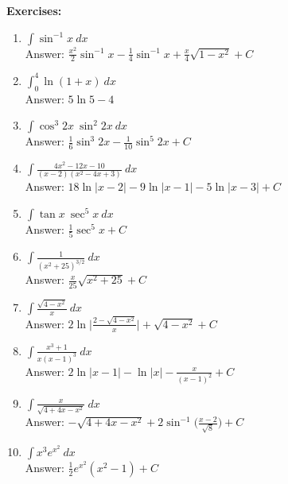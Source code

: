 \documentclass[11pt]{report}
\newcommand{\ds}{\displaystyle}
\begin{document}
\textbf{Exercises:}\\

\begin{enumerate}
\item $\ds \int \sin^{-1}x~dx$\\
Answer: $\ds\frac{x^2}{2} \sin^{-1}x - \frac{1}{4} \sin^{-1}x + \frac{x}{4} \sqrt{1-x^2}+C$\\

\item $\ds \int_0^4 \ln (1+x)~dx$\\
Answer: $\ds 5\ln 5 - 4$\\

\item $\ds \int \cos^3 2x~\sin^2 2x~dx$\\
Answer: $\ds\frac{1}{6} \sin^3 2x - \frac{1}{10} \sin^5 2x +C$\\

\item $\ds \int \frac{4x^2-12x-10}{(x-2)(x^2-4x+3)}~dx$\\
Answer: $\ds 18\ln |x-2| - 9\ln|x-1|- 5\ln|x-3|+C$\\

\item $\ds \int \tan x~\sec^5 x~dx$\\
Answer: $\ds\frac{1}{5} \sec^5 x+C$\\

\item $\ds \int \frac{1}{(x^2+25)^{3/2}}~dx$\\
Answer: $\ds\frac{x}{25} \sqrt{x^2+25}+C$\\

\item $\ds \int \frac{\sqrt{4-x^2}}{x}~dx$\\
Answer: $\ds 2 \ln \biggl|\frac{2-\sqrt{4-x^2}}{x}\biggr| + \sqrt{4-x^2}+C$\\

\item $\ds \int \frac{x^3+1}{x(x-1)^3}~dx$\\
Answer: $\ds 2 \ln |x-1| - \ln |x| - \frac{x}{(x-1)^2}+C$\\

\item $\ds \int \frac{x}{\sqrt{4+4x-x^2}}~dx$\\
Answer: $\ds -\sqrt{4+4x-x^2} + 2 \sin^{-1}\bigl(\frac{x-2}{\sqrt 8}\bigr)+C$\\

\item $\ds \int x^3 e^{x^2} ~dx$\\
Answer: $\ds \frac{1}{2} e^{x^2}(x^2-1)+C$\\


\end{enumerate}
\end{document}
